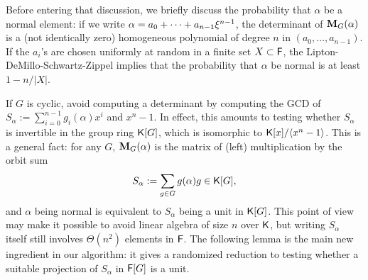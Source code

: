 Before entering that discussion, we briefly discuss the probability that
$\alpha$ be a normal element: if we write
$\alpha = a_0 + \cdots + a_{n-1} \xi^{n-1}$, the determinant of
$\mat M_G(\alpha)$ is a (not identically zero) homogeneous polynomial of
degree $n$ in $(a_0,\dots,a_{n-1})$. If the $a_i$'s are chosen uniformly at
random in a finite set $X \subset {\mathsf{F}}$, the Lipton-DeMillo-Schwartz-Zippel
implies that the probability that $\alpha$ be normal is at least $1-n/|X|$.

If $G$ is cyclic, \cite{GatGie90} avoid computing a determinant by
computing the GCD of $S_\alpha := \sum_{i = 0}^{n-1} g_i(\alpha)x^i$
and $x^n-1$. In effect, this amounts to testing whether $S_\alpha$ is
invertible in the group ring ${\mathsf{K}}[G]$, which is isomorphic to
${\mathsf{K}}[x]/\langle x^n-1\rangle$. This is a general fact: for any $G$,
$\mat M_G(\alpha)$ is the matrix of (left) multiplication by the orbit
sum
$$S_\alpha:= \sum_{g \in G} g(\alpha)g \in {\mathsf{K}}[G],$$ and $\alpha$ being
normal is equivalent to $S_\alpha$ being a unit in ${\mathsf{K}}[G]$. This point of
view may make it possible to avoid linear algebra of size $n$ over ${\mathsf{K}}$,
but writing $S_\alpha$ itself still involves $\Theta(n^2)$ elements in
${\mathsf{F}}$. The following lemma is the main new ingredient in our algorithm: it
gives a randomized reduction to testing whether a suitable projection of
$S_\alpha$ in ${\mathsf{F}}[G]$ is a unit.
 


